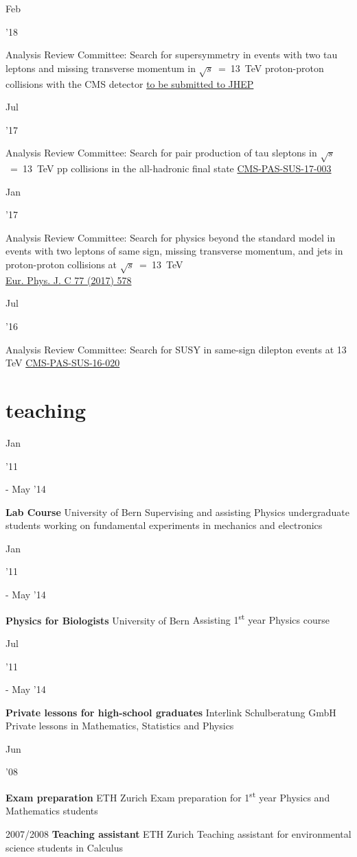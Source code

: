 \documentclass[]{cv} %
\begin{document}
\begin{entrylist}

  \entry
  {\parbox[t]{\parboxWidthOne}{Feb}\parbox[t]{\parboxWidthTwo}{\hfill '18}}
  {Analysis Review Committee: Search for supersymmetry in events with two tau
  leptons and missing transverse momentum in $\sqrt{s}$~=~13~TeV proton-proton
  collisions with the CMS detector}
  {\href{}{to be submitted to JHEP}}
  {}

  \entry
  {\parbox[t]{\parboxWidthOne}{Jul}\parbox[t]{\parboxWidthTwo}{\hfill '17}}
  {Analysis Review Committee: Search for pair production of tau sleptons in
  $\sqrt{s}$~=~13~TeV pp collisions in the all-hadronic final state}
  {\href{https://cds.cern.ch/record/2273395}{CMS-PAS-SUS-17-003}}
  {}

  \entry
  {\parbox[t]{\parboxWidthOne}{Jan}\parbox[t]{\parboxWidthTwo}{\hfill '17}}
  {Analysis Review Committee: Search for physics beyond the standard model in
  events with two leptons of same sign, missing transverse momentum, and jets in
  proton-proton collisions at $\sqrt{s}$~=~13~TeV\\}
  {\href{https://link.springer.com/article/10.1140\%2Fepjc\%2Fs10052-017-5079-z}{Eur. Phys. J. C 77 (2017) 578}}
  {}

  \entry
  {\parbox[t]{\parboxWidthOne}{Jul}\parbox[t]{\parboxWidthTwo}{\hfill '16}}
  {Analysis Review Committee: Search for SUSY in same-sign dilepton events at 13 TeV}
  {\href{https://cds.cern.ch/record/2204929}{CMS-PAS-SUS-16-020}}
  {}

\end{entrylist}

\newpage
\section{teaching}

\begin{entrylist}

  \entry
  {\parbox[t]{\parboxWidthOne}{Jan}\parbox[t]{\parboxWidthTwo}{\hfill '11} - May '14}
  {\textbf{Lab Course}}
  {University of Bern}
  {Supervising and assisting Physics undergraduate students working on fundamental experiments in mechanics and electronics}

  \entry
  {\parbox[t]{\parboxWidthOne}{Jan}\parbox[t]{\parboxWidthTwo}{\hfill '11} - May '14}
  {\textbf{Physics for Biologists}}
  {University of Bern}
  {Assisting 1\textsuperscript{st} year Physics course}

  \entry
  {\parbox[t]{\parboxWidthOne}{Jul}\parbox[t]{\parboxWidthTwo}{\hfill '11} - May '14}
  {\textbf{Private lessons for high-school graduates}}
  {Interlink Schulberatung GmbH}
  {Private lessons in Mathematics, Statistics and Physics}

  \entry
  {\parbox[t]{\parboxWidthOne}{Jun}\parbox[t]{\parboxWidthTwo}{\hfill '08}}
  {\textbf{Exam preparation}}
  {ETH Zurich}
  {Exam preparation for 1\textsuperscript{st} year Physics and Mathematics students}

  \entry
  {2007/2008}
  {\textbf{Teaching assistant}}
  {ETH Zurich}
  {Teaching assistant for environmental science students in Calculus}

\end{entrylist}
\end{document}
